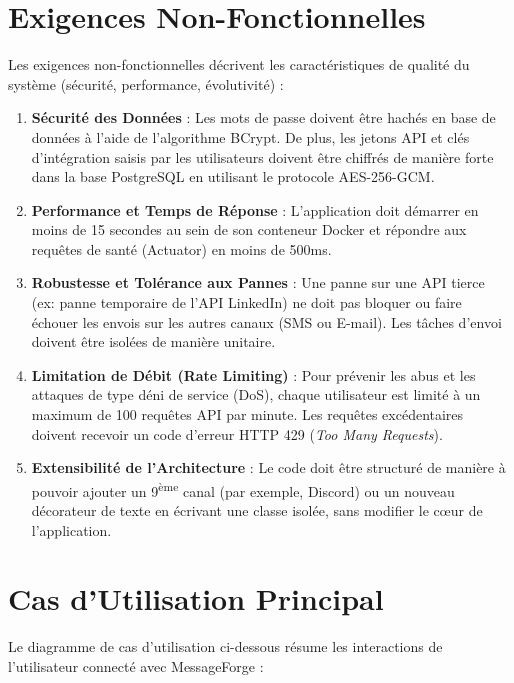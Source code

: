 \section{Exigences Non-Fonctionnelles}

Les exigences non-fonctionnelles décrivent les caractéristiques de qualité du système (sécurité, performance, évolutivité) :

\begin{enumerate}
    \item \textbf{Sécurité des Données} : Les mots de passe doivent être hachés en base de données à l'aide de l'algorithme BCrypt. De plus, les jetons API et clés d'intégration saisis par les utilisateurs doivent être chiffrés de manière forte dans la base PostgreSQL en utilisant le protocole AES-256-GCM.
    \item \textbf{Performance et Temps de Réponse} : L'application doit démarrer en moins de 15 secondes au sein de son conteneur Docker et répondre aux requêtes de santé (Actuator) en moins de 500ms.
    \item \textbf{Robustesse et Tolérance aux Pannes} : Une panne sur une API tierce (ex: panne temporaire de l'API LinkedIn) ne doit pas bloquer ou faire échouer les envois sur les autres canaux (SMS ou E-mail). Les tâches d'envoi doivent être isolées de manière unitaire.
    \item \textbf{Limitation de Débit (Rate Limiting)} : Pour prévenir les abus et les attaques de type déni de service (DoS), chaque utilisateur est limité à un maximum de 100 requêtes API par minute. Les requêtes excédentaires doivent recevoir un code d'erreur HTTP 429 (\textit{Too Many Requests}).
    \item \textbf{Extensibilité de l'Architecture} : Le code doit être structuré de manière à pouvoir ajouter un 9\textsuperscript{ème} canal (par exemple, Discord) ou un nouveau décorateur de texte en écrivant une classe isolée, sans modifier le cœur de l'application.
\end{enumerate}

\section{Cas d'Utilisation Principal}

Le diagramme de cas d'utilisation ci-dessous résume les interactions de l'utilisateur connecté avec MessageForge :

